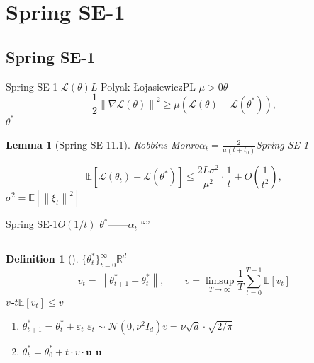 \documentclass[11pt,a4paper]{article}
\newtheorem{lemma}[theorem]{Lemma}
\newtheorem{definition}[theorem]{Definition}
\theoremstyle{remark}
\newcommand{\R}{\mathbb{R}}
\newcommand{\E}{\mathbb{E}}
\newcommand{\norm}[1]{\left\lVert#1\right\rVert}
\begin{document}
\section{Spring SE-1}

\subsection{Spring SE-1}

Spring SE-1\cite{scx2026spring_convergence}
$\mathcal{L}(\theta)$$L$-Polyak-ŁojasiewiczPL
$\mu > 0$$\theta$
\begin{equation}\label{eq:pl}
    \frac{1}{2}\norm{\nabla\mathcal{L}(\theta)}^2 \geq \mu(\mathcal{L}(\theta) - \mathcal{L}(\theta^*)),
\end{equation}
$\theta^*$

\begin{lemma}[Spring SE-11.1]\label{lem:spring_static}
Robbins-Monro$\alpha_t = \frac{2}{\mu(t + t_0)}$Spring SE-1

\begin{equation}
    \E[\mathcal{L}(\theta_t) - \mathcal{L}(\theta^*)] \leq \frac{2L\sigma^2}{\mu^2} \cdot \frac{1}{t} + O\left(\frac{1}{t^2}\right),
\end{equation}
$\sigma^2 = \E[\norm{\xi_t}^2]$
\end{lemma}

Spring SE-1$O(1/t)$
$\theta^*$——$\alpha_t$
``''

\subsection{}



\begin{definition}[]\label{def:time_varying}
\textbf{}$\{\theta_t^*\}_{t=0}^{\infty}$$\R^d$
\textbf{}
\begin{equation}
    v_t = \norm{\theta_{t+1}^* - \theta_t^*}, \qquad
    v = \limsup_{T \to \infty} \frac{1}{T}\sum_{t=0}^{T-1} \E[v_t]
\end{equation}
\textbf{$v$-}$t$$\E[v_t] \leq v$
\end{definition}



\begin{enumerate}[label=\,\arabic*:, leftmargin=*]
    \item \textbf{}$\theta_{t+1}^* = \theta_t^* + \varepsilon_t$
          $\varepsilon_t \sim \mathcal{N}(0, \nu^2 I_d)$$v = \nu\sqrt{d} \cdot \sqrt{2/\pi}$
    \item \textbf{}$\theta_t^* = \theta_0^* + t \cdot v \cdot \mathbf{u}$
          $\mathbf{u}$
\end{enumerate}
\end{document}
